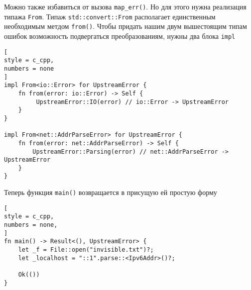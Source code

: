 \documentclass[%
	11pt,
	a4paper,
	utf8,
		]{article}
\begin{document}
Можно также избавиться от вызова \verb|map_err()|. Но для этого нужна реализация типажа \verb|From|. Типаж \verb|std::convert::From| располагает единственным необходимым метдом \verb|from()|. Чтобы придать нашим двум вышестоящим типам ошибок возможность подвергаться преобразованиям, нужны два блока \verb|impl|
\begin{lstlisting}[
style = c_cpp,
numbers = none
]
impl From<io::Error> for UpstreamError {
    fn from(error: io::Error) -> Self {
         UpstreamError::IO(error) // io::Error -> UpstreamError
    }
} 

impl From<net::AddrParseError> for UpstreamError {
    fn from(error: net::AddrParseError) -> Self {
        UpstreamError::Parsing(error) // net::AddrParseError -> UpstreamError
    }
}
\end{lstlisting}

Теперь функция \verb|main()| возвращается в присущую ей простую форму
\begin{lstlisting}[
style = c_cpp,
numbers = none,
]
fn main() -> Result<(), UpstreamError> {
    let _f = File::open("invisible.txt")?;
    let _localhost = "::1".parse::<Ipv6Addr>()?;
    
    Ok(())
}
\end{lstlisting}












\begin{thebibliography}{99}
	
\end{thebibliography}


\lstlistoflistings{}
\end{document}
